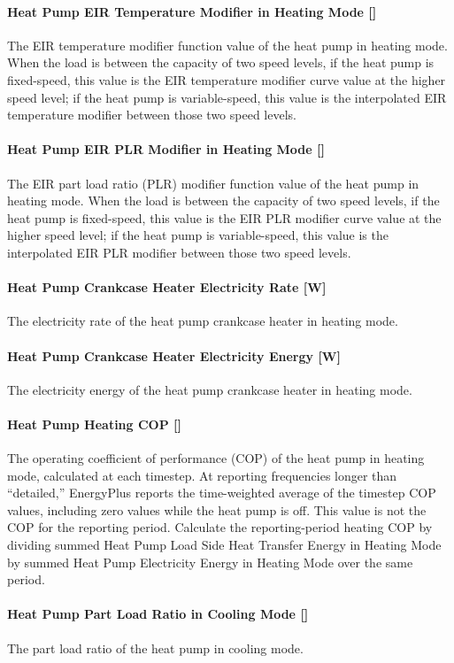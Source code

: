 \paragraph{Heat Pump EIR Temperature Modifier in Heating Mode {[}{]}}
The EIR temperature modifier function value of the heat pump in heating
mode. When the load is between the capacity of two speed levels, if the heat
pump is fixed-speed, this value is the EIR temperature modifier curve value
at the higher speed level; if the heat pump is variable-speed, this value is the
interpolated EIR temperature modifier between those two speed levels.
\paragraph{Heat Pump EIR PLR Modifier in Heating Mode {[}{]}}
The EIR part load ratio (PLR) modifier function value of the heat pump in heating
mode. When the load is between the capacity of two speed levels, if the heat
pump is fixed-speed, this value is the EIR PLR modifier curve value
at the higher speed level; if the heat pump is variable-speed, this value is the
interpolated EIR PLR modifier between those two speed levels.
\paragraph{Heat Pump Crankcase Heater Electricity Rate {[}W{]}} The electricity
rate of the heat pump crankcase heater in heating mode.
\paragraph{Heat Pump Crankcase Heater Electricity Energy {[}W{]}} The
electricity energy of the heat pump crankcase heater in heating mode.
\paragraph{Heat Pump Heating COP {[}{]}} The operating coefficient of performance
(COP) of the heat pump in heating mode, calculated at each timestep.
At reporting frequencies longer than ``detailed,'' EnergyPlus reports the
time-weighted average of the timestep COP values, including zero values while
the heat pump is off. This value is not the COP for the reporting period. Calculate
the reporting-period heating COP by dividing summed Heat Pump Load Side Heat
Transfer Energy in Heating Mode by summed Heat Pump Electricity Energy in Heating
Mode over the same period.
\paragraph{Heat Pump Part Load Ratio in Cooling Mode {[}{]}} The part load ratio
of the heat pump in cooling mode.
